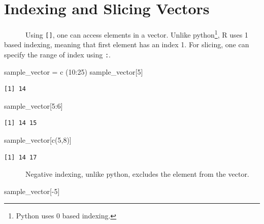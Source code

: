 \documentclass[
  letterpaper,
  DIV=11,
  numbers=noendperiod]{scrreprt}
\newenvironment{Shaded}{\begin{snugshade}}{\end{snugshade}}
\newcommand{\DecValTok}[1]{\textcolor[rgb]{0.68,0.00,0.00}{#1}}
\newcommand{\FunctionTok}[1]{\textcolor[rgb]{0.28,0.35,0.67}{#1}}
\newcommand{\NormalTok}[1]{\textcolor[rgb]{0.00,0.23,0.31}{#1}}
\newcommand{\OtherTok}[1]{\textcolor[rgb]{0.00,0.23,0.31}{#1}}
\newcommand{\SpecialCharTok}[1]{\textcolor[rgb]{0.37,0.37,0.37}{#1}}
\begin{document}
\section{Indexing and Slicing
Vectors}\label{indexing-and-slicing-vectors}

~~~~~~Using \texttt{{[}{]}}, one can access elements in a vector. Unlike
python\footnote{Python uses 0 based indexing.}, R uses 1 based indexing,
meaning that first element has an index 1. For slicing, one can specify
the range of index using \texttt{:}.

\begin{Shaded}
\begin{Highlighting}[]
\NormalTok{sample\_vector }\OtherTok{=} \FunctionTok{c}\NormalTok{ (}\DecValTok{10}\SpecialCharTok{:}\DecValTok{25}\NormalTok{)}
\NormalTok{sample\_vector[}\DecValTok{5}\NormalTok{]}
\end{Highlighting}
\end{Shaded}

\begin{verbatim}
[1] 14
\end{verbatim}

\begin{Shaded}
\begin{Highlighting}[]
\NormalTok{sample\_vector[}\DecValTok{5}\SpecialCharTok{:}\DecValTok{6}\NormalTok{]}
\end{Highlighting}
\end{Shaded}

\begin{verbatim}
[1] 14 15
\end{verbatim}

\begin{Shaded}
\begin{Highlighting}[]
\NormalTok{sample\_vector[}\FunctionTok{c}\NormalTok{(}\DecValTok{5}\NormalTok{,}\DecValTok{8}\NormalTok{)]}
\end{Highlighting}
\end{Shaded}

\begin{verbatim}
[1] 14 17
\end{verbatim}

~~~~~~Negative indexing, unlike python, excludes the element from the
vector.

\begin{Shaded}
\begin{Highlighting}[]
\NormalTok{sample\_vector[}\SpecialCharTok{{-}}\DecValTok{5}\NormalTok{]}
\end{Highlighting}
\end{Shaded}
\end{document}
